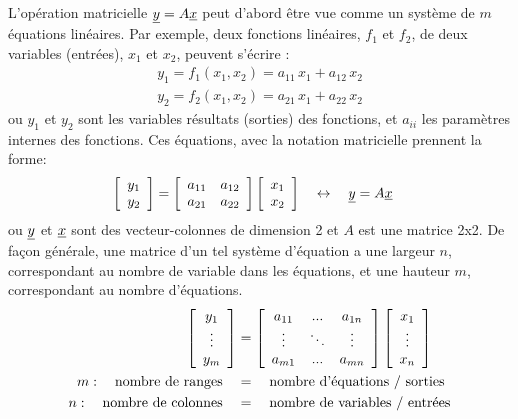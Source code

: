 L'opération matricielle $\underline{y} = A \underline{x}$ peut d'abord être vue comme un système de $m$ équations linéaires.  Par exemple, deux fonctions linéaires, $f_1$ et $f_2$, de deux variables (entrées), $x_1$ et $x_2$, peuvent s’écrire :
\begin{align}
y_1 = f_1(x_1,x_2) = a_{11} \, x_1 + a_{12} \, x_2   \\
y_2 = f_2(x_1,x_2) = a_{21} \, x_1 + a_{22} \, x_2
\end{align}
ou $y_1$ et $y_2$ sont les variables résultats (sorties) des fonctions, et $a_{ii}$ les paramètres internes des fonctions. Ces équations, avec la notation matricielle prennent la forme:
\begin{align}
\left[ \begin{array}{c} 
	y_1 \\ y_2
\end{array} \right] &= 
\left[ \begin{array}{c c} 
a_{11} & a_{12} \\ a_{21} & a_{22}
\end{array} \right]
\left[ \begin{array}{c} 
	x_1 \\ x_2
\end{array} \right] \quad \leftrightarrow \quad  \underline{y}  =   A  \underline{x} 
\label{eq:sys2}
\end{align}
ou $\underline{y}$ et $\underline{x}$ sont des vecteur-colonnes de dimension 2 et $A$ est une matrice 2x2. De façon générale, une matrice d'un tel système d’équation a une largeur $n$, correspondant au nombre de variable dans les équations, et une hauteur $m$, correspondant au nombre d’équations.
%
\begin{align}
\left[ \begin{array}{c} 
	y_1 \\ \vdots \\ y_m
\end{array} \right] &= 
\left[ \begin{array}{c c c} 
a_{11} & ... & a_{1n} \\ \vdots & \ddots  &  \vdots \\ 
a_{m1} & ... & a_{mn}
\end{array} \right]
\left[ \begin{array}{c} 
	x_1 \\ \vdots \\ x_n
\end{array} \right] \\
m: \quad \text{nombre de ranges} \quad&=\quad \text{nombre d’équations / sorties} \\
n: \quad \text{nombre de colonnes} \quad&=\quad \text{nombre de variables / entrées}
\end{align}
%


